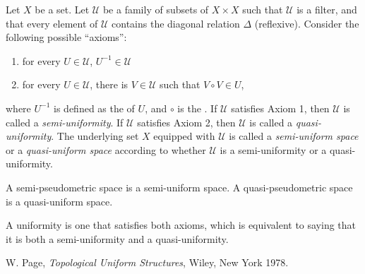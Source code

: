 \documentclass[12pt]{article}
\begin{document}
Let $X$ be a set.  Let $\mathcal{U}$ be a family of subsets of $X\times X$ such that $\mathcal{U}$ is a filter, and that every element of $\mathcal{U}$ contains the diagonal relation $\Delta$ (reflexive).  Consider the following possible ``axioms'':
\begin{enumerate}
\item for every $U\in \mathcal{U}$, $U^{-1}\in \mathcal{U}$
\item for every $U\in \mathcal{U}$, there is $V\in \mathcal{U}$ such that $V\circ V\in U$,
\end{enumerate}

where $U^{-1}$ is defined as the  of $U$, and $\circ$ is the .  If $\mathcal{U}$ satisfies Axiom 1, then $\mathcal{U}$ is called a \emph{semi-uniformity}.  If $\mathcal{U}$ satisfies Axiom 2, then $\mathcal{U}$ is called a \emph{quasi-uniformity}.  The underlying set $X$ equipped with $\mathcal{U}$ is called a \emph{semi-uniform space} or a \emph{quasi-uniform space} according to whether $\mathcal{U}$ is a semi-uniformity or a quasi-uniformity.

A semi-pseudometric space is a semi-uniform space.  A quasi-pseudometric space is a quasi-uniform space.

A uniformity is one that satisfies both axioms, which is equivalent to saying that it is both a semi-uniformity and a quasi-uniformity.

\begin{thebibliography}{9}
 W. Page, \emph{Topological Uniform Structures}, Wiley, New York 1978.
\end{thebibliography}
\end{document}
